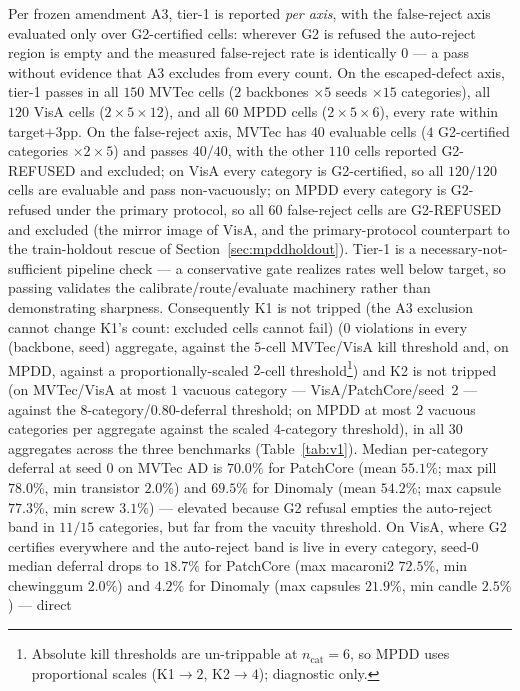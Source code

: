 \documentclass[preprint,11pt]{elsarticle}
\begin{document}
Per frozen amendment A3, tier-1 is reported \emph{per axis}, with the false-reject axis
evaluated only over G2-certified cells: wherever G2 is refused the auto-reject region is empty
and the measured false-reject rate is identically $0$ --- a pass without evidence that A3
excludes from every count. On the escaped-defect axis, tier-1 passes in all $150$
MVTec cells ($2$ backbones $\times 5$ seeds $\times 15$ categories), all $120$
VisA cells ($2 \times 5 \times 12$), and all $60$ MPDD cells ($2 \times 5 \times 6$),
every rate within target$+3$pp. On the false-reject
axis, MVTec has $40$ evaluable cells ($4$ G2-certified categories $\times 2 \times 5$) and
passes $40/40$, with the other $110$ cells reported G2-REFUSED and excluded; on VisA
every category is G2-certified, so all $120/120$ cells are evaluable and pass
non-vacuously; on MPDD every category is G2-refused under the primary protocol, so all $60$
false-reject cells are G2-REFUSED and excluded (the mirror image of VisA, and the primary-protocol
counterpart to the train-holdout rescue of Section~\ref{sec:mpddholdout}). Tier-1 is a necessary-not-sufficient pipeline check --- a conservative gate
realizes rates well below target, so passing validates the calibrate/route/evaluate machinery
rather than demonstrating sharpness. Consequently K1 is not tripped (the A3 exclusion
cannot change K1's count: excluded cells cannot fail) ($0$ violations in every
(backbone, seed) aggregate, against the $5$-cell MVTec/VisA kill threshold and, on MPDD, against
a proportionally-scaled $2$-cell threshold\footnote{Absolute kill thresholds are un-trippable at
$n_{\text{cat}}=6$, so MPDD uses proportional scales (K1$\to 2$, K2$\to 4$); diagnostic only.}) and K2 is
not tripped (on MVTec/VisA at most $1$ vacuous category --- VisA/PatchCore/seed~$2$ --- against the
$8$-category/$0.80$-deferral threshold; on MPDD at most $2$ vacuous categories per aggregate
against the scaled $4$-category threshold), in all $30$ aggregates across the three
benchmarks (Table~\ref{tab:v1}). Median per-category deferral at seed $0$ on MVTec AD is
$70.0\%$ for PatchCore (mean $55.1\%$; max pill $78.0\%$, min transistor $2.0\%$) and $69.5\%$
for Dinomaly (mean $54.2\%$; max capsule $77.3\%$, min screw $3.1\%$) --- elevated because G2 refusal
empties the auto-reject band in $11/15$ categories, but far from the vacuity threshold. On VisA,
where G2 certifies everywhere and the auto-reject band is live in every category, seed-$0$
median deferral drops to $18.7\%$ for PatchCore (max macaroni2 $72.5\%$, min chewinggum
$2.0\%$) and $4.2\%$ for Dinomaly (max capsules $21.9\%$, min candle $2.5\%$) --- direct
\end{document}
